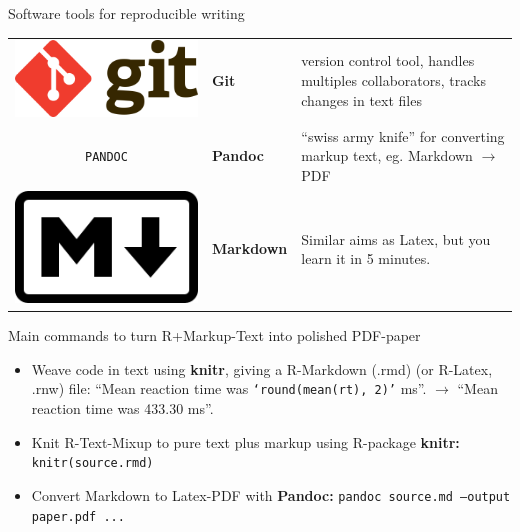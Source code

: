 \documentclass[final,hyperref={pdfpagelabels=false}]{beamer}
\begin{document}
\begin{frame}{}
\begin{columns}[t]
\begin{column}{.48\linewidth}
\begin{block}{Software tools for reproducible writing}
\begin{tabulary}{1.0\textwidth}{CLL}
 \includegraphics[valign=T, scale=.3]{logo/git_logo} & \textbf{Git} & version control tool, handles multiples collaborators, tracks changes in text files\\
 \texttt{PANDOC} &  \textbf{Pandoc} & ``swiss army knife'' for converting markup text, eg. Markdown $\rightarrow$ PDF\\
 \includegraphics[valign=T, scale=.5]{logo/markdown_logo} & \textbf{Markdown} & Similar aims as Latex, but you learn it in 5 minutes.\\  
  \end{tabulary}
  
   \end{block}



        \begin{block}{Main commands to turn R+Markup-Text into polished PDF-paper}
        
       
          \begin{itemize}
             \item Weave code in text using \textbf{knitr}, giving a R-Markdown (.rmd) (or R-Latex, .rnw) file: ``Mean reaction time was \texttt{`round(mean(rt), 2)'} ms''. $\rightarrow$ ``Mean reaction time was 433.30 ms''.
             \item Knit R-Text-Mixup to pure text plus markup using R-package \textbf{knitr:}
             \newline \texttt{knitr(source.rmd)} 
             \item Convert Markdown to Latex-PDF with \textbf{Pandoc:} 
             \newline \texttt{pandoc source.md --output paper.pdf ...} 
      \end{itemize}
          

\end{block}
\end{column}
\end{columns}
\end{frame}
\end{document}
